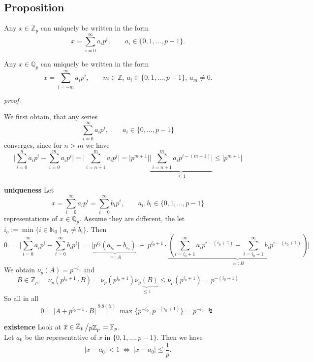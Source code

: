 \documentclass[12pt]{book}
\newcommand{\slant}[2]{{\raisebox{.1em}{$#1$}\left/\raisebox{-.1em}{$#2$}\right.}}
\begin{document}
\begin{spacing}{1.3}
\subsection{Proposition}%
\begin{compactenum}
\item Any $x \in \mathbb{Z}_p$ can uniquely be written in the form 
$$x= \sum_{i=0}^{\infty} a_i p^{i}, \qquad a_i \in \{0,1, \ldots, p-1\}.$$
\item Any $x \in \mathbb{Q}_p$ can uniquely be written in the form 
$$x=\sum_{i=-m}^{\infty} a_i p^{i}, \qquad m \in \mathbb{Z}, \ a_i \in \{0,1, \ldots, p-1\},\ a_m\neq0.$$
\end{compactenum}
\textit{proof.}
\begin{compactenum}
\item We first obtain, that any series
$$\sum_{i=0}^{\infty}a_i p^{i}, \qquad a_i \in \{0, \ldots, p-1\}$$
converges, since for $n>m$ we have
$$\bigg\vert \sum_{i=0}^n a_i p^{i}-\sum_{i=0}^m a_ip^{i} \bigg\vert = \bigg\vert\sum_{i=n+1}^m a_ip^{i} \bigg\vert = \big\vert p^{m+1}\big\vert \underbrace{\bigg\vert \sum_{i=n+1}^m a_i p^{i-(m+1)} \bigg\vert}_{\leqslant 1} \leqslant \big\vert p^{m+1} \big\vert$$
\begin{compactenum}
\item[\textbf{uniqueness}] Let
$$x=\sum_{i=0}^{\infty} a_i p^{i} = \sum_{i=0}^{\infty} b_i p^{i}, \qquad a_i, b_i \in \{0,1, \ldots, p-1\}$$
representations of $x \in \mathbb{Q}_p$. Assume they are different, the let $i_o:= \min\{i \in \mathbb{N}_0 \mid a_i \neq b_i\}$. Then 
$$0 \ = \ \bigg\vert \sum_{i=0}^{\infty} a_i p^{i} - \sum_{i=0}^{\infty} b_i p^{i} \bigg\vert \ =\ \Bigg\vert \underbrace{p^{i_0} (a_{i_0}-b_{i_0})}_{=:A} \ + \ p^{i_0+1} \cdot \underbrace{\left(\sum_{i=i_0+1}^{\infty} a_i p^{i-(i_0+1)} - \sum_{i=i_0+1}^{\infty} b_i p^{i-(i_0+1)} \right)}_{=:B}\Bigg\vert $$
We obtain
$\nu_p(A)=p^{-i_0}$
and
$$ B \in \mathbb{Z}_p, \quad \nu_p\left(p^{i_0+1} \cdot B\right) = \nu_p\left(p^{i_0+1}\right) \underbrace{\nu_p(B)}_{\leqslant 1} \leqslant \nu_p\left(p^{i_0+1}\right)=p^{-(i_0+1)}$$
So all in all
$$0=\big\vert A+ p^{i_0+1} \cdot B \big\vert \overset{9.8(ii)}{=} \max\{p^{-i_0}, p^{-(i_0+1)}\} = p^{-i_0} \ \lightning $$
\item[\textbf{existence}] Look at $\overline{x} \in \slant{\mathbb{Z}_p}{p \mathbb{Z}_p} = \mathbb{F}_p$.\\
Let $a_0$ be the representative of $x$ in $\{0,1, \ldots, p-1\}$. Then we have
$$|x-a_0| < 1 \ \Leftrightarrow \ |x-a_0| \leqslant \frac{1}{p}.$$

\end{compactenum}
\end{compactenum}
\end{spacing}
\end{document}
